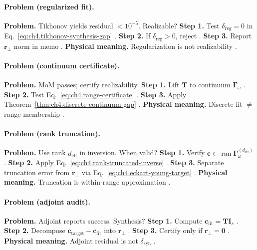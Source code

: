 \paragraph{Problem (regularized fit).}
\textbf{Problem.} Tikhonov yields residual \(<10^{-5}\). Realizable?
\textbf{Step 1.} Test \(\delta_{\mathrm{reg}}=0\) in Eq.~\eqref{eq:ch4.tikhonov-synthesis-gap} \cite{harrington2001}.
\textbf{Step 2.} If \(\delta_{\mathrm{reg}}>0\), reject \cite{devaney2004,stratton1941}.
\textbf{Step 3.} Report \(\mathbf{r}_{\perp}\) norm in memo \cite{hansen1988}.
\textbf{Physical meaning.} Regularization is not realizability \cite{stratton1941}.

\paragraph{Problem (continuum certificate).}
\textbf{Problem.} MoM passes; certify realizability.
\textbf{Step 1.} Lift \(\mathbf{T}\) to continuum \(\boldsymbol{\Gamma}_\omega\) \cite{harrington2001}.
\textbf{Step 2.} Test Eq.~\eqref{eq:ch4.range-certificate} \cite{stratton1941,devaney2004}.
\textbf{Step 3.} Apply Theorem~\ref{thm:ch4.discrete-continuum-gap} \cite{hansen1988}.
\textbf{Physical meaning.} Discrete fit \(\neq\) range membership \cite{stratton1941}.

\paragraph{Problem (rank truncation).}
\textbf{Problem.} Use rank \(d_{\mathrm{eff}}\) in inversion. When valid?
\textbf{Step 1.} Verify \(\mathbf{c}\in\operatorname{ran}\boldsymbol{\Gamma}_\omega^{(d_{\mathrm{eff}})}\) \cite{harrington2001}.
\textbf{Step 2.} Apply Eq.~\eqref{eq:ch4.rank-truncated-inverse} \cite{hansen1988,stratton1941}.
\textbf{Step 3.} Separate truncation error from \(\mathbf{r}_{\perp}\) via Eq.~\eqref{eq:ch4.eckart-young-target} \cite{devaney2004}.
\textbf{Physical meaning.} Truncation is within-range approximation \cite{harrington2001}.

\paragraph{Problem (adjoint audit).}
\textbf{Problem.} Adjoint reports success. Synthesis?
\textbf{Step 1.} Compute \(\mathbf{c}_{\mathrm{fit}}=\mathbf{T}\mathbf{I}_{s}\) \cite{harrington2001}.
\textbf{Step 2.} Decompose \(\mathbf{c}_{\mathrm{target}}-\mathbf{c}_{\mathrm{fit}}\) into \(\mathbf{r}_{\perp}\) \cite{stratton1941,devaney2004}.
\textbf{Step 3.} Certify only if \(\mathbf{r}_{\perp}=\mathbf{0}\) \cite{hansen1988}.
\textbf{Physical meaning.} Adjoint residual is not \(\delta_{\mathrm{syn}}\) \cite{harrington2001}.

